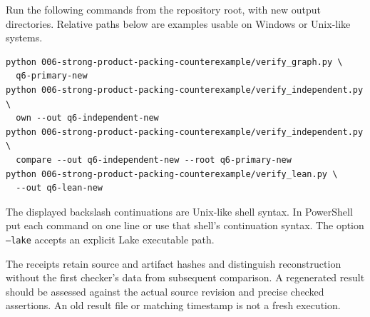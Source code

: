 \documentclass[11pt]{article}
\theoremstyle{definition}
\theoremstyle{remark}
\begin{document}
Run the following commands from the repository root, with
new output directories. Relative paths below are examples
usable on Windows or Unix-like systems.
\begin{verbatim}
python 006-strong-product-packing-counterexample/verify_graph.py \
  q6-primary-new
python 006-strong-product-packing-counterexample/verify_independent.py \
  own --out q6-independent-new
python 006-strong-product-packing-counterexample/verify_independent.py \
  compare --out q6-independent-new --root q6-primary-new
python 006-strong-product-packing-counterexample/verify_lean.py \
  --out q6-lean-new
\end{verbatim}
The displayed backslash continuations are Unix-like shell syntax.
In PowerShell put each command on one line or use that shell's
continuation syntax. The option \texttt{--lake} accepts an
explicit Lake executable path.

The receipts retain source and artifact hashes and distinguish
reconstruction without the first checker's data from subsequent
comparison. A regenerated result should be assessed against
the actual source revision and precise checked assertions.
An old result file or matching timestamp is not a fresh execution.
\end{document}
